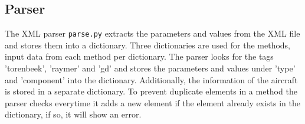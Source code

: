 \subsection{Parser}
\label{subsec:parser}
The XML parser \texttt{parse.py} extracts the parameters and values from the XML file and stores them into a dictionary.
Three dictionaries are used for the methods, input data from each method per dictionary.
The parser looks for the tags 'torenbeek', 'raymer' and 'gd' and stores the parameters and values under 'type' and 'component' into the dictionary.
Additionally, the information of the aircraft is stored in a separate dictionary.
To prevent duplicate elements in a method the parser checks everytime it adds a new element if the element already exists in the dictionary, if so, it will show an error.
